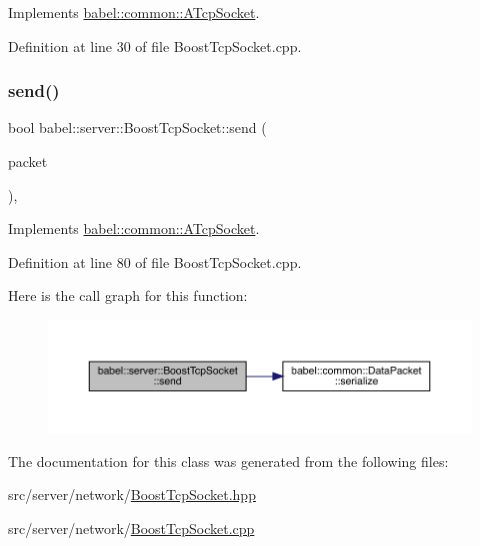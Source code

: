 Implements \mbox{\hyperlink{classbabel_1_1common_1_1_a_tcp_socket_a8bfec8f1b34e75429f9e912ed7108936}{babel\+::common\+::\+A\+Tcp\+Socket}}.



Definition at line 30 of file Boost\+Tcp\+Socket.\+cpp.

\mbox{\label{classbabel_1_1server_1_1_boost_tcp_socket_a037e9440c226c8701b55b005d9f1eea4}} 
\subsubsection{\texorpdfstring{send()}{send()}}
{\footnotesize\ttfamily bool babel\+::server\+::\+Boost\+Tcp\+Socket\+::send (\begin{DoxyParamCaption}\item[{\mbox{\hyperlink{classbabel_1_1common_1_1_data_packet}{common\+::\+Data\+Packet}}}]{packet }\end{DoxyParamCaption})\hspace{0.3cm}{\ttfamily [override]}, {\ttfamily [virtual]}}



Implements \mbox{\hyperlink{classbabel_1_1common_1_1_a_tcp_socket_a4c6b77b93cedcb874caa0a9cee6cad36}{babel\+::common\+::\+A\+Tcp\+Socket}}.



Definition at line 80 of file Boost\+Tcp\+Socket.\+cpp.

Here is the call graph for this function\+:\nopagebreak
\begin{figure}[H]
\begin{center}
\leavevmode
\includegraphics[width=350pt]{classbabel_1_1server_1_1_boost_tcp_socket_a037e9440c226c8701b55b005d9f1eea4_cgraph}
\end{center}
\end{figure}


The documentation for this class was generated from the following files\+:\begin{DoxyCompactItemize}
\item 
src/server/network/\mbox{\hyperlink{_boost_tcp_socket_8hpp}{Boost\+Tcp\+Socket.\+hpp}}\item 
src/server/network/\mbox{\hyperlink{_boost_tcp_socket_8cpp}{Boost\+Tcp\+Socket.\+cpp}}\end{DoxyCompactItemize}
